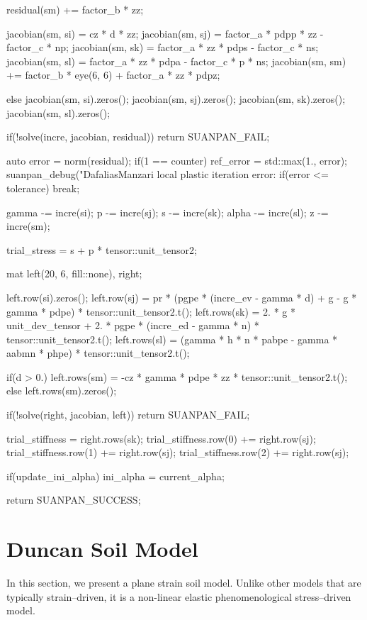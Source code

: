 \begin{cppcode}
{{{            residual(sm) += factor_b * zz;

            jacobian(sm, si) = cz * d * zz;
            jacobian(sm, sj) = factor_a * pdpp * zz - factor_c * np;
            jacobian(sm, sk) = factor_a * zz * pdps - factor_c * ns;
            jacobian(sm, sl) = factor_a * zz * pdpa - factor_c * p * ns;
            jacobian(sm, sm) += factor_b * eye(6, 6) + factor_a * zz * pdpz;
        }
        else {
            jacobian(sm, si).zeros();
            jacobian(sm, sj).zeros();
            jacobian(sm, sk).zeros();
            jacobian(sm, sl).zeros();
        }

        if(!solve(incre, jacobian, residual)) return SUANPAN_FAIL;

        auto error = norm(residual);
        if(1 == counter) ref_error = std::max(1., error);
        suanpan_debug("DafaliasManzari local plastic iteration error: %
        if(error <= tolerance) break;

        gamma -= incre(si);
        p -= incre(sj);
        s -= incre(sk);
        alpha -= incre(sl);
        z -= incre(sm);
    }

    trial_stress = s + p * tensor::unit_tensor2;

    mat left(20, 6, fill::none), right;

    left.row(si).zeros();
    left.row(sj) = pr * (pgpe * (incre_ev - gamma * d) + g - g * gamma * pdpe) * tensor::unit_tensor2.t();
    left.rows(sk) = 2. * g * unit_dev_tensor + 2. * pgpe * (incre_ed - gamma * n) * tensor::unit_tensor2.t();
    left.rows(sl) = (gamma * h * n * pabpe - gamma * aabmn * phpe) * tensor::unit_tensor2.t();

    if(d > 0.) left.rows(sm) = -cz * gamma * pdpe * zz * tensor::unit_tensor2.t();
    else left.rows(sm).zeros();

    if(!solve(right, jacobian, left)) return SUANPAN_FAIL;

    trial_stiffness = right.rows(sk);
    trial_stiffness.row(0) += right.row(sj);
    trial_stiffness.row(1) += right.row(sj);
    trial_stiffness.row(2) += right.row(sj);

    if(update_ini_alpha) ini_alpha = current_alpha;

    return SUANPAN_SUCCESS;
}
\end{cppcode}
\section{Duncan Soil Model}
In this section, we present a plane strain soil model.
Unlike other models that are typically strain--driven, it is a non-linear elastic phenomenological stress--driven model.
